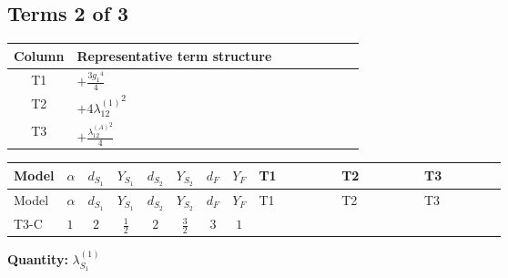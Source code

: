 \documentclass[8pt]{article}
\begin{document}
\begin{landscape}
\subsection*{Terms 2 of 3}
\begin{center}
\begin{tabular}{@{}c >{\raggedright\arraybackslash}p{0.82\linewidth}@{}}
\toprule
Column & Representative term structure \\
\midrule
T1 & \(\displaystyle +\frac{3 {g_1}^4}{4}\) \\
\midrule
T2 & \(\displaystyle +4 {\lambda_{12}^{(1)}}^2\) \\
\midrule
T3 & \(\displaystyle +\frac{{\lambda_{12}^{(A)}}^2}{4}\) \\
\midrule
\bottomrule
\end{tabular}
\end{center}
\smallskip
\tiny
\begin{longtable}{@{}llcccccc >{\raggedright\arraybackslash}p{0.21\linewidth} >{\raggedright\arraybackslash}p{0.21\linewidth} >{\raggedright\arraybackslash}p{0.21\linewidth}@{}}
\toprule
Model & $\alpha$ & $d_{S_1}$ & $Y_{S_1}$ & $d_{S_2}$ & $Y_{S_2}$ & $d_F$ & $Y_F$ & T1 & T2 & T3 \\
\midrule
\endfirsthead
\toprule
Model & $\alpha$ & $d_{S_1}$ & $Y_{S_1}$ & $d_{S_2}$ & $Y_{S_2}$ & $d_F$ & $Y_F$ & T1 & T2 & T3 \\
\midrule
\endhead
T3-C & $1$ & $2$ & $\frac{1}{2}$ & $2$ & $\frac{3}{2}$ & $3$ & $1$ & \scriptsize\adjustbox{max width=\linewidth}{$\begin{gathered} +\frac{3 {g_1}^4}{4}\end{gathered}$} & \scriptsize\adjustbox{max width=\linewidth}{$\begin{gathered} +4 {\lambda_{12}^{(1)}}^2\end{gathered}$} & \scriptsize\adjustbox{max width=\linewidth}{$\begin{gathered} +\frac{{\lambda_{12}^{(A)}}^2}{4}\end{gathered}$} \\
\midrule
\bottomrule
\end{longtable}
\clearpage
\noindent\textbf{Quantity: }$\lambda_{S_1}^{(1)}$\par\smallskip

\end{landscape}
\end{document}
